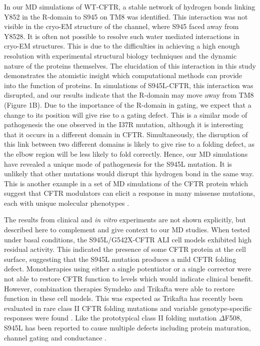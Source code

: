 In our MD simulations of WT-CFTR, a stable network of hydrogen bonds linking Y852 in the R-domain to S945 on TM8 was identified. This interaction was not visible in the cryo-EM structure of the channel, where S945 faced away from Y8528. It is often not possible to resolve such water mediated interactions in cryo-EM structures. This is due to the difficulties in achieving a high enough resolution with experimental structural biology techniques and the dynamic nature of the proteins themselves. The elucidation of this interaction in this study demonstrates the atomistic insight which computational methods can provide into the function of proteins. In simulations of S945L-CFTR, this interaction was disrupted, and our results indicate that the R-domain may move away from TM8 (Figure 1B). Due to the importance of the R-domain in gating, we expect that a change to its position will give rise to a gating defect. This is a similar mode of pathogenesis the one observed in the I37R mutation, although it is interesting that it occurs in a different domain in CFTR. Simultaneously, the disruption of this link between two different domains is likely to give rise to a folding defect, as the elbow region will be less likely to fold correctly. Hence, our MD simulations have revealed a unique mode of pathogenesis for the S945L mutation. It is unlikely that other mutations would disrupt this hydrogen bond in the same way. This is another example in a set of MD simulations of the CFTR protein which suggest that CFTR modulators can elicit a response in many missense mutations, each with unique molecular phenotypes \cite{wong2022,wong2022a,billet2020,sabusap2021}. 

The results from clinical and \textit{in vitro} experiments are not shown explicitly, but described here to complement and give context to our MD studies. When tested under basal conditions, the S945L/G542X-CFTR ALI cell models exhibited high residual activity. This indicated the presence of some CFTR protein at the cell surface, suggesting that the S945L mutation produces a mild CFTR folding defect. Monotherapies using either a single potentiator or a single corrector were not able to restore CFTR function to levels which would indicate clinical benefit. However, combination therapies Symdeko and Trikafta were able to restore function in these cell models. This was expected as Trikafta has recently been evaluated in rare class II CFTR folding mutations and variable genotype-specific responses were found \cite{veit2020, laselva2021}. Like the prototypical class II folding mutation $\Delta$F508, S945L has been reported to cause multiple defects including protein maturation, channel gating and conductance \cite{seibert1996}. 

